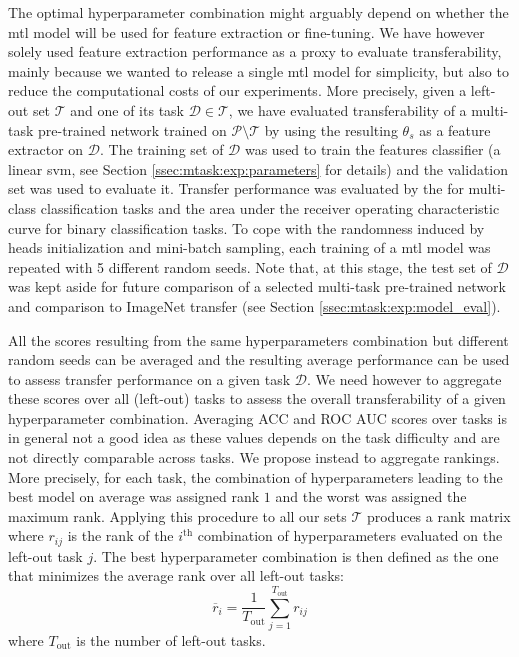 The optimal hyperparameter combination might arguably depend on whether the \acrshort{mtl} model will be used for feature extraction or fine-tuning. We have however solely used feature extraction performance as a proxy to evaluate transferability, mainly because we wanted to release a single \acrshort{mtl} model for simplicity, but also to reduce the computational costs of our experiments. More precisely, given a left-out set $\mathcal{T}$ and one of its task $\mathcal{D} \in \mathcal{T}$, we have evaluated transferability of a multi-task pre-trained network trained on $\mathcal{P} \setminus \mathcal{T}$ by using the resulting $\theta_s$ as a feature extractor on $\mathcal{D}$. The training set of $\mathcal{D}$ was used to train the features classifier (\ie a linear \acrshort{svm}, see Section \ref{ssec:mtask:exp:parameters} for details) and the validation set was used to evaluate it. Transfer performance was evaluated by the  for multi-class classification tasks and the area under the receiver operating characteristic curve \rocauc for binary classification tasks. To cope with the randomness induced by heads initialization and mini-batch sampling, each training of a \acrshort{mtl} model was repeated with 5 different random seeds. Note that, at this stage, the test set of $\mathcal{D}$ was kept aside for future comparison of a selected multi-task pre-trained network and comparison to ImageNet transfer (see Section \ref{ssec:mtask:exp:model_eval}).

All the scores resulting from the same hyperparameters combination but different random seeds can be averaged and the resulting average performance can be used to assess transfer performance on a given task $\mathcal{D}$. We need however to aggregate these scores over all (left-out) tasks to assess the overall transferability of a given hyperparameter combination. Averaging ACC and ROC AUC scores over tasks is in general not a good idea as these values depends on the task difficulty and are not directly comparable across tasks. We propose instead to aggregate rankings. More precisely, for each task, the combination of hyperparameters leading to the best model on average was assigned rank $1$ and the worst was assigned the maximum rank. Applying this procedure to all our sets $\mathcal{T}$ produces a rank matrix where $r_{ij}$ is the rank of the $i^{\text{th}}$ combination of hyperparameters evaluated on the left-out task $j$. The best hyperparameter combination is then defined as the one that minimizes the average rank over all left-out tasks:
\begin{equation} \label{eqn:average_ranks}
\overline{r}_i = \dfrac{1}{T_{\text{out}}} \sum^{T_{\text{out}}}_{j = 1} r_{ij}
\end{equation}
where $T_{\text{out}}$ is the number of left-out tasks.

